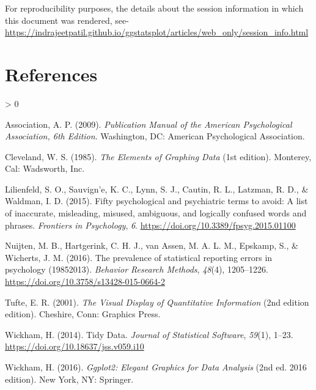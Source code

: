 \documentclass[
]{article}
\newlength{\cslhangindent}
\newenvironment{CSLReferences}[2] %
 {%
  \setlength{\parindent}{0pt}
  \ifodd #1 \everypar{\setlength{\hangindent}{\cslhangindent}}\ignorespaces\fi
  \ifnum #2 > 0
  \setlength{\parskip}{#2\baselineskip}
  \fi
 }%
 {}
\begin{document}
For reproducibility purposes, the details about the session information in which
this document was rendered, see-
\url{https://indrajeetpatil.github.io/ggstatsplot/articles/web_only/session_info.html}

\newpage

\hypertarget{references}{%
\section*{References}\label{references}}

\hypertarget{refs}{}
\begin{CSLReferences}{1}{0}
\leavevmode\hypertarget{ref-associationPublicationManualAmerican2009}{}%
Association, A. P. (2009). \emph{Publication {Manual} of the {American Psychological Association}, 6th {Edition}}. {Washington, DC}: {American Psychological Association}.

\leavevmode\hypertarget{ref-clevelandElementsGraphingData1985}{}%
Cleveland, W. S. (1985). \emph{The {Elements} of {Graphing Data}} (1st edition). {Monterey, Cal}: {Wadsworth, Inc.}

\leavevmode\hypertarget{ref-lilienfeldFiftyPsychologicalPsychiatric2015}{}%
Lilienfeld, S. O., Sauvign'e, K. C., Lynn, S. J., Cautin, R. L., Latzman, R. D., \& Waldman, I. D. (2015). Fifty psychological and psychiatric terms to avoid: A list of inaccurate, misleading, misused, ambiguous, and logically confused words and phrases. \emph{Frontiers in Psychology}, \emph{6}. \url{https://doi.org/10.3389/fpsyg.2015.01100}

\leavevmode\hypertarget{ref-nuijtenPrevalenceStatisticalReporting2016}{}%
Nuijten, M. B., Hartgerink, C. H. J., van Assen, M. A. L. M., Epskamp, S., \& Wicherts, J. M. (2016). The prevalence of statistical reporting errors in psychology (1985{}2013). \emph{Behavior Research Methods}, \emph{48}(4), 1205--1226. \url{https://doi.org/10.3758/s13428-015-0664-2}

\leavevmode\hypertarget{ref-tufteVisualDisplayQuantitative2001}{}%
Tufte, E. R. (2001). \emph{The {Visual Display} of {Quantitative Information}} (2nd edition edition). {Cheshire, Conn}: {Graphics Press}.

\leavevmode\hypertarget{ref-wickhamTidyData2014}{}%
Wickham, H. (2014). Tidy {Data}. \emph{Journal of Statistical Software}, \emph{59}(1), 1--23. \url{https://doi.org/10.18637/jss.v059.i10}

\leavevmode\hypertarget{ref-wickhamGgplot2ElegantGraphics2016}{}%
Wickham, H. (2016). \emph{Ggplot2: {Elegant Graphics} for {Data Analysis}} (2nd ed. 2016 edition). {New York, NY}: {Springer}.

\end{CSLReferences}
\end{document}
